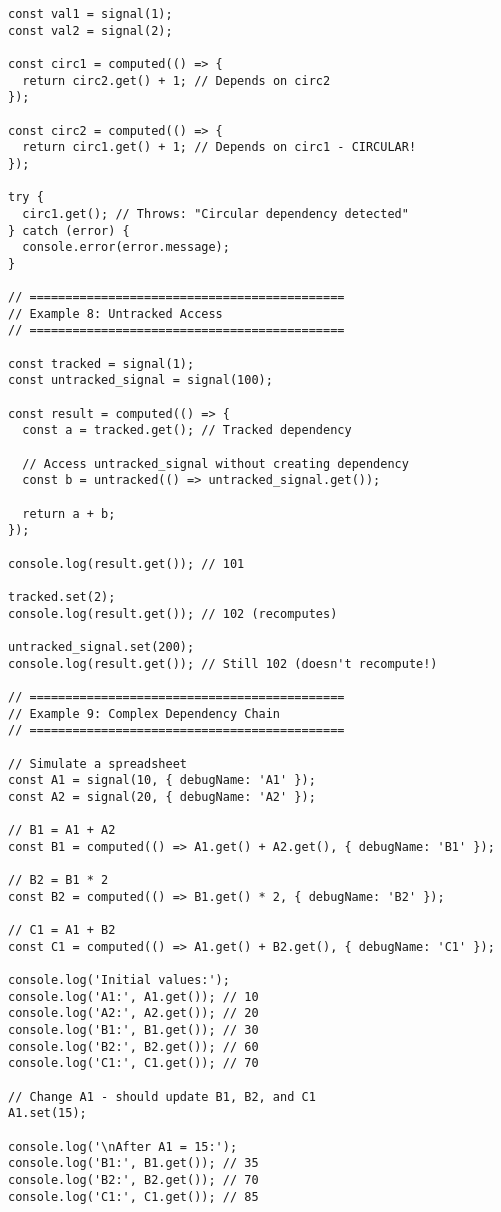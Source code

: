\documentclass[11pt]{article}
\begin{document}
\begin{verbatim}
const val1 = signal(1);
const val2 = signal(2);

const circ1 = computed(() => {
  return circ2.get() + 1; // Depends on circ2
});

const circ2 = computed(() => {
  return circ1.get() + 1; // Depends on circ1 - CIRCULAR!
});

try {
  circ1.get(); // Throws: "Circular dependency detected"
} catch (error) {
  console.error(error.message);
}

// ============================================
// Example 8: Untracked Access
// ============================================

const tracked = signal(1);
const untracked_signal = signal(100);

const result = computed(() => {
  const a = tracked.get(); // Tracked dependency
  
  // Access untracked_signal without creating dependency
  const b = untracked(() => untracked_signal.get());
  
  return a + b;
});

console.log(result.get()); // 101

tracked.set(2);
console.log(result.get()); // 102 (recomputes)

untracked_signal.set(200);
console.log(result.get()); // Still 102 (doesn't recompute!)

// ============================================
// Example 9: Complex Dependency Chain
// ============================================

// Simulate a spreadsheet
const A1 = signal(10, { debugName: 'A1' });
const A2 = signal(20, { debugName: 'A2' });

// B1 = A1 + A2
const B1 = computed(() => A1.get() + A2.get(), { debugName: 'B1' });

// B2 = B1 * 2
const B2 = computed(() => B1.get() * 2, { debugName: 'B2' });

// C1 = A1 + B2
const C1 = computed(() => A1.get() + B2.get(), { debugName: 'C1' });

console.log('Initial values:');
console.log('A1:', A1.get()); // 10
console.log('A2:', A2.get()); // 20
console.log('B1:', B1.get()); // 30
console.log('B2:', B2.get()); // 60
console.log('C1:', C1.get()); // 70

// Change A1 - should update B1, B2, and C1
A1.set(15);

console.log('\nAfter A1 = 15:');
console.log('B1:', B1.get()); // 35
console.log('B2:', B2.get()); // 70
console.log('C1:', C1.get()); // 85


\end{verbatim}
\end{document}

